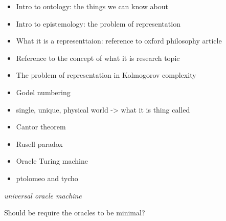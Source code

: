 \begin{itemize}
\item Intro to ontology: the things we can know about
\item Intro to epistemology: the problem of representation
\item What it is a representtaion: reference to oxford philosophy article
\item Reference to the concept of what it is research topic
\item The problem of representation in Kolmogorov complexity
\item Godel numbering
\item single, unique, physical world -> what it is thing called
\item Cantor theorem
\item Rusell paradox
\item Oracle Turing machine
\item ptolomeo and tycho
\end{itemize}

\emph{universal oracle machine}

Should be require the oracles to be minimal?